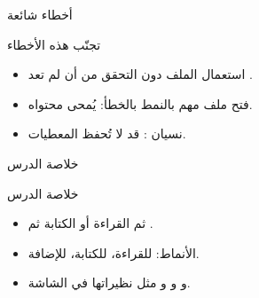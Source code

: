 \documentclass[aspectratio=169, 11pt, t, xcolor={table}]{beamer}
\begin{document}
\begin{frame}{أخطاء شائعة}
    \begin{obox}{\faExclamationTriangle\quad تجنّب هذه الأخطاء}
        \begin{itemize}
            \item استعمال الملف دون التحقق من أن  لم تعد .
            \item فتح ملف مهم بالنمط  بالخطأ: يُمحى محتواه.
            \item نسيان : قد لا تُحفظ المعطيات.
        \end{itemize}
    \end{obox}
\end{frame}

\begin{frame}{خلاصة الدرس}
    \begin{tbox}{\faCheckCircle\quad خلاصة الدرس}
        \begin{itemize}
            \item {} ثم القراءة أو الكتابة ثم .
            \item الأنماط:  للقراءة،  للكتابة،  للإضافة.
            \item {} و و و مثل نظيراتها في الشاشة.
        \end{itemize}
    \end{tbox}
\end{frame}
\end{document}
